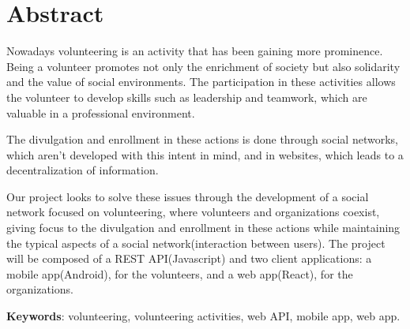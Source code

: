 \section{Abstract}
Nowadays volunteering is an activity that has been gaining more prominence.
Being a volunteer promotes not only the enrichment of society but also solidarity and the value of social environments. The participation in these activities allows the volunteer to develop skills such as leadership and teamwork, which are valuable in a professional environment. \par \smallskip
The divulgation and enrollment in these actions is done through social networks, which aren't developed with this intent in mind, and in websites, which leads to a decentralization of information. \par \smallskip
Our project looks to solve these issues through the development of a social network focused on volunteering, where volunteers and organizations coexist, giving focus to the divulgation and enrollment in these actions while maintaining the typical aspects of a social network(interaction between users). The project will be composed of a REST API(Javascript) and two client applications: a mobile app(Android), for the volunteers, and a web app(React), for the organizations. \par \smallskip
\textbf{Keywords}: volunteering, volunteering activities, web API, mobile app, web app.